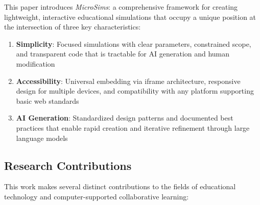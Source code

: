This paper introduces \textit{MicroSims}: a comprehensive framework for creating lightweight, interactive educational simulations that occupy a unique position at the intersection of three key characteristics:

\begin{enumerate}
\item \textbf{Simplicity}: Focused simulations with clear parameters, constrained scope, and transparent code that is tractable for AI generation and human modification
\item \textbf{Accessibility}: Universal embedding via iframe architecture, responsive design for multiple devices, and compatibility with any platform supporting basic web standards
\item \textbf{AI Generation}: Standardized design patterns and documented best practices that enable rapid creation and iterative refinement through large language models
\end{enumerate}

\subsection{Research Contributions}

This work makes several distinct contributions to the fields of educational technology and computer-supported collaborative learning:

